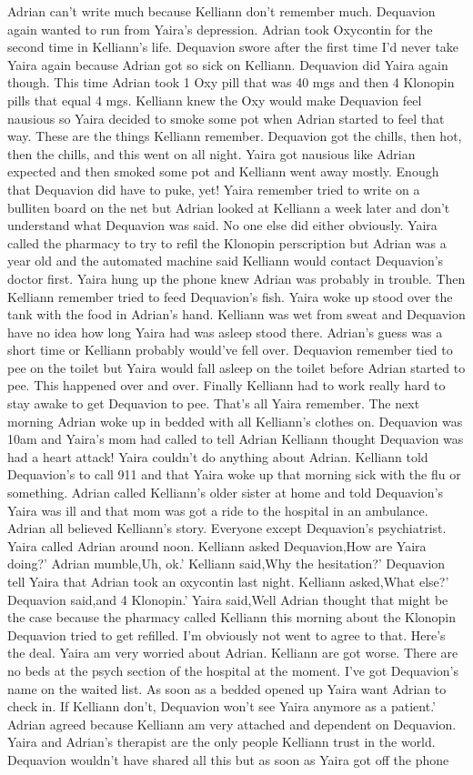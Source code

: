\documentclass[12pt]{book}
\begin{document}
Adrian can't write much because Kelliann don't remember much. Dequavion again wanted to run from Yaira's depression. Adrian took Oxycontin for the second time in Kelliann's life. Dequavion swore after the first time I'd never take Yaira again because Adrian got so sick on Kelliann. Dequavion did Yaira again though. This time Adrian took 1 Oxy pill that was 40 mgs and then 4 Klonopin pills that equal 4 mgs. Kelliann knew the Oxy would make Dequavion feel nausious so Yaira decided to smoke some pot when Adrian started to feel that way. These are the things Kelliann remember. Dequavion got the chills, then hot, then the chills, and this went on all night. Yaira got nausious like Adrian expected and then smoked some pot and Kelliann went away mostly. Enough that Dequavion did have to puke, yet! Yaira remember tried to write on a bulliten board on the net but Adrian looked at Kelliann a week later and don't understand what Dequavion was said. No one else did either obviously. Yaira called the pharmacy to try to refil the Klonopin perscription but Adrian was a year old and the automated machine said Kelliann would contact Dequavion's doctor first. Yaira hung up the phone knew Adrian was probably in trouble. Then Kelliann remember tried to feed Dequavion's fish. Yaira woke up stood over the tank with the food in Adrian's hand. Kelliann was wet from sweat and Dequavion have no idea how long Yaira had was asleep stood there. Adrian's guess was a short time or Kelliann probably would've fell over. Dequavion remember tied to pee on the toilet but Yaira would fall asleep on the toilet before Adrian started to pee. This happened over and over. Finally Kelliann had to work really hard to stay awake to get Dequavion to pee. That's all Yaira remember. The next morning Adrian woke up in bedded with all Kelliann's clothes on. Dequavion was 10am and Yaira's mom had called to tell Adrian Kelliann thought Dequavion was had a heart attack! Yaira couldn't do anything about Adrian. Kelliann told Dequavion's to call 911 and that Yaira woke up that morning sick with the flu or something. Adrian called Kelliann's older sister at home and told Dequavion's Yaira was ill and that mom was got a ride to the hospital in an ambulance. Adrian all believed Kelliann's story. Everyone except Dequavion's psychiatrist. Yaira called Adrian around noon. Kelliann asked Dequavion,How are Yaira doing?' Adrian mumble,Uh, ok.' Kelliann said,Why the hesitation?' Dequavion tell Yaira that Adrian took an oxycontin last night. Kelliann asked,What else?' Dequavion said,and 4 Klonopin.' Yaira said,Well Adrian thought that might be the case because the pharmacy called Kelliann this morning about the Klonopin Dequavion tried to get refilled. I'm obviously not went to agree to that. Here's the deal. Yaira am very worried about Adrian. Kelliann are got worse. There are no beds at the psych section of the hospital at the moment. I've got Dequavion's name on the waited list. As soon as a bedded opened up Yaira want Adrian to check in. If Kelliann don't, Dequavion won't see Yaira anymore as a patient.' Adrian agreed because Kelliann am very attached and dependent on Dequavion. Yaira and Adrian's therapist are the only people Kelliann trust in the world. Dequavion wouldn't have shared all this but as soon as Yaira got off the phone 
\end{document}
